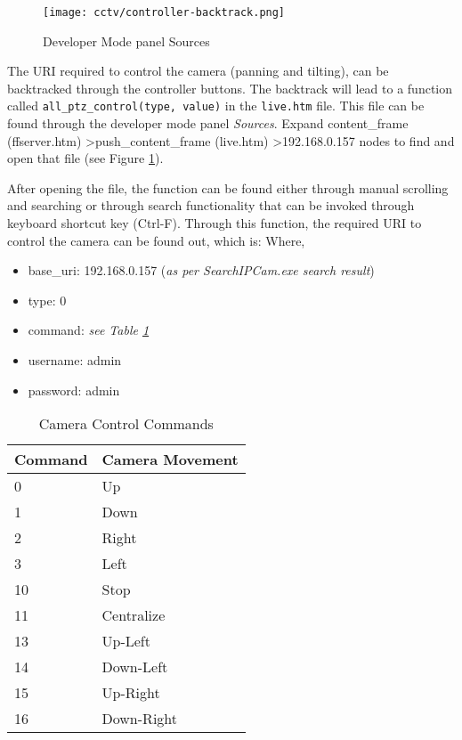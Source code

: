 \begin{figure}[h]
\caption{Developer Mode panel Sources}
\label{developer-mode-panel-sources}
\centering
\texttt{[image: cctv/controller-backtrack.png]}
\end{figure}

The URI required to control the camera (panning and tilting), can be backtracked through the controller buttons. The backtrack will lead to a function called \texttt{all\_ptz\_control(type, value)} in the \texttt{live.htm} file. This file can be found through the developer mode panel \emph{Sources}. Expand content\_frame (ffserver.htm) \textgreater push\_content\_frame (live.htm) \textgreater 192.168.0.157 nodes to find and open that file (see Figure \ref{developer-mode-panel-sources}).

After opening the file, the function can be found either through manual scrolling and searching or through search functionality that can be invoked through keyboard shortcut key (Ctrl-F). Through this function, the required URI to control the camera can be found out, which is:
\newline
{}
\newline
{}
\newline
Where,
\begin{itemize}
\item base\_uri: 192.168.0.157 (\emph{as per SearchIPCam.exe search result})
\item type: 0
\item command: \emph{see Table \ref{camera-control-commands}}
\item username: admin
\item password: admin
\end{itemize}

\begin{table}[h]
\centering
\caption{Camera Control Commands}
\label{camera-control-commands}
\begin{tabular}{|l|l|}
\hline
Command & Camera Movement \\
\hline
0 & Up \\
1 & Down \\
2 & Right \\
3 & Left \\
10 & Stop \\
11 & Centralize \\
13 & Up-Left \\
14 & Down-Left \\
15 & Up-Right \\
16 & Down-Right\\
\hline
\end{tabular}
\end{table}

